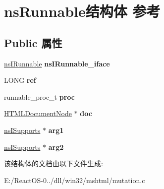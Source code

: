 \hypertarget{structns_runnable}{}\section{ns\+Runnable结构体 参考}
\label{structns_runnable}
\subsection*{Public 属性}
\begin{DoxyCompactItemize}
\item 
\mbox{\label{structns_runnable_abaf1e35294c866ced3d473666c56fb16}} 
\hyperlink{interfacens_i_runnable}{ns\+I\+Runnable} {\bfseries ns\+I\+Runnable\+\_\+iface}
\item 
\mbox{\label{structns_runnable_a6ca6641c16801df316c0907ead72831e}} 
L\+O\+NG {\bfseries ref}
\item 
\mbox{\label{structns_runnable_ae94c8ecd25f3978ed52c045b723cd07b}} 
runnable\+\_\+proc\+\_\+t {\bfseries proc}
\item 
\mbox{\label{structns_runnable_a7121fb8b2c28db86bff01100914fbf4f}} 
\hyperlink{struct_h_t_m_l_document_node}{H\+T\+M\+L\+Document\+Node} $\ast$ {\bfseries doc}
\item 
\mbox{\label{structns_runnable_a1b0892628036f9cf88f7a526fc5ff22d}} 
\hyperlink{interfacens_i_supports}{ns\+I\+Supports} $\ast$ {\bfseries arg1}
\item 
\mbox{\label{structns_runnable_a1935fffdbeba6ff17dedabcc785daa7e}} 
\hyperlink{interfacens_i_supports}{ns\+I\+Supports} $\ast$ {\bfseries arg2}
\end{DoxyCompactItemize}


该结构体的文档由以下文件生成\+:\begin{DoxyCompactItemize}
\item 
E\+:/\+React\+O\+S-\/0../dll/win32/mshtml/mutation.\+c\end{DoxyCompactItemize}
